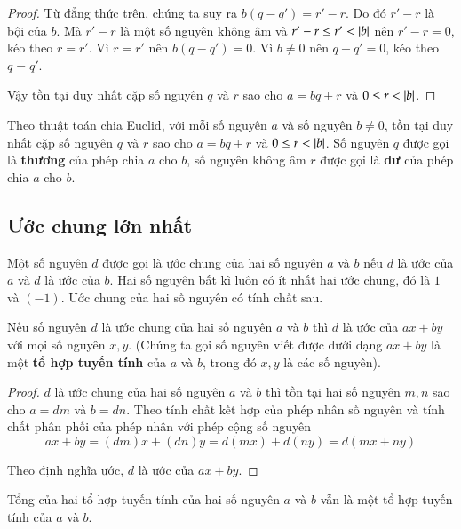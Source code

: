 \begin{proof}
    Từ đẳng thức trên, chúng ta suy ra $b(q - q') = r' - r$. Do đó $r' - r$ là bội của $b$. Mà $r' - r$ là một số nguyên không âm và $r' - r\leq r' < \left\vert{b}\right\vert$ nên $r' - r = 0$, kéo theo $r = r'$. Vì $r = r'$ nên $b(q - q') = 0$. Vì $b\ne 0$ nên $q - q' = 0$, kéo theo $q = q'$.

    Vậy tồn tại duy nhất cặp số nguyên $q$ và $r$ sao cho $a = bq + r$ và $0\leq r < \left\vert{b}\right\vert$.
\end{proof}

\begin{definition}[Thương và Dư]
    Theo thuật toán chia Euclid, với mỗi số nguyên $a$ và số nguyên $b\ne 0$, tồn tại duy nhất cặp số nguyên $q$ và $r$ sao cho $a = bq + r$ và $0\leq r < \left\vert{b}\right\vert$. Số nguyên $q$ được gọi là \textbf{thương} của phép chia $a$ cho $b$, số nguyên không âm $r$ được gọi là \textbf{dư} của phép chia $a$ cho $b$.
\end{definition}

\subsection{Ước chung lớn nhất}

Một số nguyên $d$ được gọi là ước chung của hai số nguyên $a$ và $b$ nếu $d$ là ước của $a$ và $d$ là ước của $b$. Hai số nguyên bất kì luôn có ít nhất hai ước chung, đó là $1$ và $(-1)$. Ước chung của hai số nguyên có tính chất sau.

\begin{theorem}\label{theorem:linear-combination-and-common-divisor}
    Nếu số nguyên $d$ là ước chung của hai số nguyên $a$ và $b$ thì $d$ là ước của $ax + by$ với mọi số nguyên $x, y$. (Chúng ta gọi số nguyên viết được dưới dạng $ax + by$ là một \textbf{tổ hợp tuyến tính} của $a$ và $b$, trong đó $x, y$ là các số nguyên).
\end{theorem}

\begin{proof}
    $d$ là ước chung của hai số nguyên $a$ và $b$ thì tồn tại hai số nguyên $m, n$ sao cho $a = dm$ và $b = dn$. Theo tính chất kết hợp của phép nhân số nguyên và tính chất phân phối của phép nhân với phép cộng số nguyên
    \[
        ax + by = (dm)x + (dn)y = d(mx) + d(ny) = d(mx + ny)
    \]

    Theo định nghĩa ước, $d$ là ước của $ax + by$.
\end{proof}

\begin{theorem}
    Tổng của hai tổ hợp tuyến tính của hai số nguyên $a$ và $b$ vẫn là một tổ hợp tuyến tính của $a$ và $b$.
\end{theorem}

